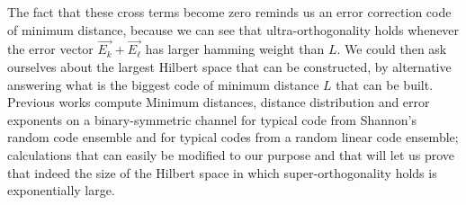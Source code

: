 \indent The fact that these cross terms become zero reminds us an error correction code of minimum distance, because we can see that ultra-orthogonality holds whenever the error vector $\vec{E_k}+\vec{E_\ell}$ has larger hamming weight than $L$. We could then ask ourselves about the largest Hilbert space that can be constructed, by alternative answering what is the biggest code of minimum distance $L$ that can be built. Previous works \cite{barg_random_2002} compute Minimum distances, distance distribution and error exponents on a binary-symmetric channel for typical code from Shannon's random code ensemble and for typical codes from a random linear code ensemble; calculations that can easily be modified to our purpose and that will let us prove that indeed the size of the Hilbert space in which super-orthogonality holds is exponentially large.\\










